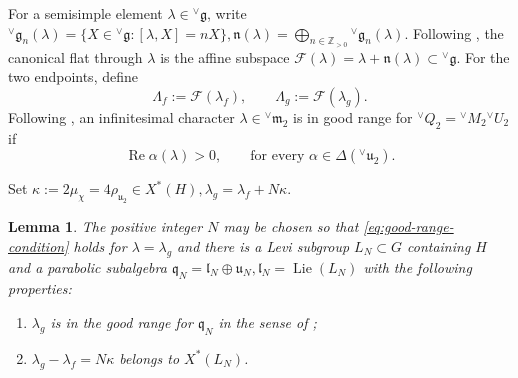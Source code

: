 \documentclass[10pt]{amsart}
\numberwithin{equation}{section}
\theoremstyle{plain}
\newtheorem{lemma}[proposition]{Lemma}
\theoremstyle{definition}
\theoremstyle{remark}
\DeclareMathOperator{\Lie}{Lie}
\newcommand{\ZZ}{\mathbb Z}
\newcommand{\fg}{\mathfrak g}
\newcommand{\fm}{\mathfrak m}
\newcommand{\fq}{\mathfrak q}
\newcommand{\fu}{\mathfrak u}
\newcommand{\vM}{{}^{\vee}M}
\newcommand{\vQ}{{}^{\vee}Q}
\newcommand{\vU}{{}^{\vee}U}
\newcommand{\vfg}{{}^{\vee}\fg}
\newcommand{\vfm}{{}^{\vee}\fm}
\newcommand{\vfu}{{}^{\vee}\fu}
\newcommand{\cF}{\mathcal F}
\begin{document}
For a semisimple element $\lambda\in\vfg$, write $
 \vfg_n(\lambda)
 =
 \{X\in\vfg:[\lambda,X]=nX\},
 \mathfrak n(\lambda)
 =
 \bigoplus_{n\in\ZZ_{>0}}\vfg_n(\lambda).
$
Following \cite[Section~3.1]{AIMV26}, the canonical flat through $\lambda$
is the affine subspace $\cF(\lambda)=\lambda+\mathfrak n(\lambda)\subset\vfg$.
For the two endpoints, define
\begin{equation}\label{eq:canonical-flats}
 \Lambda_f:=\cF(\lambda_f),
 \qquad
 \Lambda_g:=\cF(\lambda_g).
\end{equation}
Following \cite[Definition~4.1.2]{AIMV26}, an infinitesimal character
$\lambda\in\vfm_2$ is in good range for
$\vQ_2=\vM_2\vU_2$ if
\begin{equation}\label{eq:good-range-condition}
 \operatorname{Re}\alpha(\lambda)>0,
 \qquad
 \text{for every }\alpha\in\Delta(\vfu_2).
\end{equation}

Set $
 \kappa:=2\mu_\chi=4\rho_{\fu_2}\in X^*(H),
 \lambda_g=\lambda_f+N\kappa$.

\begin{lemma}\label{lem:continuation-Levi}
The positive integer $N$ may be chosen so that
\eqref{eq:good-range-condition} holds for
$\lambda=\lambda_g$ and there is a Levi subgroup
$L_N\subset G$ containing $H$ and a parabolic subalgebra $
 \fq_N=\mathfrak l_N\oplus\mathfrak u_N,
 \mathfrak l_N=\Lie(L_N)$
with the following properties:
\begin{enumerate}
\item $\lambda_g$ is in the good range for $\fq_N$ in the sense of
      \cite[Definition~2.5.3]{AIMV26};
\item $\lambda_g-\lambda_f=N\kappa$
      belongs to $X^*(L_N)$.
\end{enumerate}
\end{lemma}
\end{document}
